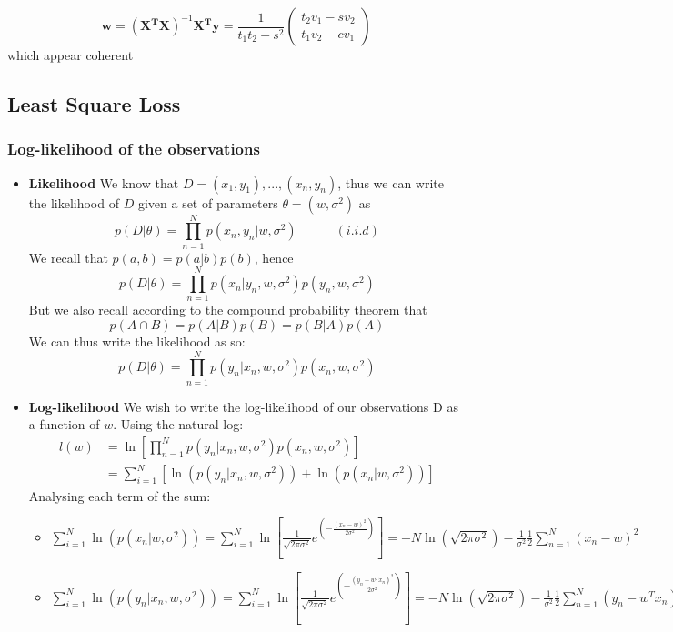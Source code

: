 \documentclass{article}
\begin{document}
\begin{equation} \label{eq4}
\boxed{
\mathbf{w} = (\mathbf{X^TX})^{-1}\mathbf{X^Ty}=\frac{1}{t_1t_2-s^2}
\begin{pmatrix}t_2v_1-sv_2\\t_1v_2-cv_1
\end{pmatrix}
}
\end{equation}
which appear coherent

\subsection{Least Square Loss}

\subsubsection{Log-likelihood of the observations}
\begin{itemize}
\item \textbf{Likelihood}
\newline We know that $D = {(x_1,y_1),...,(x_n,y_n)}$, thus we can write the likelihood of $D$ given a set of parameters $\theta = (w, \sigma^2)$ as
\[
p(D|\theta) = \prod\limits_{n=1}^Np(x_n,y_n|w,\sigma^2) \quad\quad\quad (i.i.d)
\]
We recall that $p(a,b) = p(a|b)p(b)$, hence
\[
p(D|\theta) = \prod\limits_{n=1}^Np(x_n|y_n,w,\sigma^2)p(y_n,w,\sigma^2)
\]
But we also recall according to the compound probability theorem that
\[
p(A\cap B) = p(A|B)p(B) = p(B|A)p(A)
\]
We can thus write the likelihood as so:
\[
p(D|\theta) = \prod\limits_{n=1}^Np(y_n|x_n,w,\sigma^2)p(x_n,w,\sigma^2)
\]
\item\textbf{ Log-likelihood}
\newline We wish to write the log-likelihood of our observations D as a function of $w$.
\newline Using the natural log:
\[
\begin{split}
l(w) & = \ln\left[ \prod\limits_{n=1}^Np(y_n|x_n,w,\sigma^2)p(x_n,w,\sigma^2) \right] \\
& = \sum\limits_{i=1}^{N}\left[\ln(p(y_n|x_n,w,\sigma^2))+\ln(p(x_n|w,\sigma^2))\right]
\end{split}
\]
Analysing each term of the sum:
\begin{itemize}
\item $\sum\limits_{i=1}^{N}\ln(p(x_n|w,\sigma^2)) = \sum\limits_{i=1}^{N}\ln[\frac{1}{\sqrt{2\pi\sigma^2}}e^{(-\frac{(x_n-w)^2}{2\sigma^2})}] = -N\ln(\sqrt{2\pi\sigma^2})-\frac{1}{\sigma^2}\frac{1}{2}\sum\limits_{n=1}^{N}(x_n-w)^2$
\item $\sum\limits_{i=1}^{N}\ln(p(y_n|x_n,w,\sigma^2)) = 
\sum\limits_{i=1}^{N}\ln[\frac{1}{\sqrt{2\pi\sigma^2}}e^{(-\frac{(y_n -w^Tx_n)^2}{2\sigma^2})}] = -N\ln(\sqrt{2\pi\sigma^2})-\frac{1}{\sigma^2}\frac{1}{2}\sum\limits_{n=1}^{N}(y_n -w^Tx_n)^2$
\end{itemize}
\end{itemize}
\end{document}
